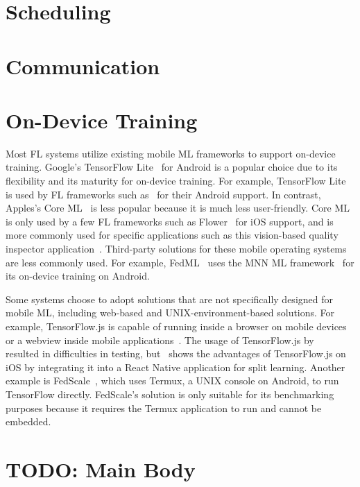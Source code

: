 \documentclass[conference]{IEEEtran}
\begin{document}
\section{Scheduling}

\section{Communication}

\section{On-Device Training}

Most FL systems utilize existing mobile ML frameworks to
support on-device training.
Google's TensorFlow Lite~\cite{tensorflow2015-whitepaper} for Android is
a popular choice due to its flexibility and
its maturity for on-device training.
For example, TensorFlow Lite is used by FL frameworks such as~\cite{
    beutel2020flower,mathur2021ondevice,kourtellis2020flaas,katevas2022flaas}
for their Android support.
In contrast, Apples's Core ML~\cite{coreml} is less popular because
it is much less user-friendly.
Core ML is only used by a few FL frameworks such as
Flower~\cite{beutel2020flower} for iOS support,
and is more commonly used for specific applications
such as this vision-based quality inspector application~\cite{bharti2022edge}.
Third-party solutions for these mobile operating systems are less commonly used.
For example, FedML~\cite{he2020fedml} uses
the MNN ML framework~\cite{jiang2020mnn} for its on-device training on Android.

Some systems choose to adopt solutions that are not specifically designed for
mobile ML,
including web-based and UNIX-environment-based solutions.
For example,
TensorFlow.js is capable of running inside a browser on mobile devices or
a webview inside mobile applications~\cite{smilkov2019tensorflow}.
The usage of TensorFlow.js by~\cite{sriraman2022device} resulted in
difficulties in testing,
but~\cite{palanisamy2021spliteasy} shows the advantages of TensorFlow.js on iOS
by integrating it into a React Native application for split learning.
Another example is FedScale~\cite{lai2022fedscale},
which uses Termux, a UNIX console on Android,
to run TensorFlow directly.
FedScale's solution is only suitable for its benchmarking purposes because
it requires the Termux application to run and
cannot be embedded.

\section{TODO: Main Body}
\end{document}
